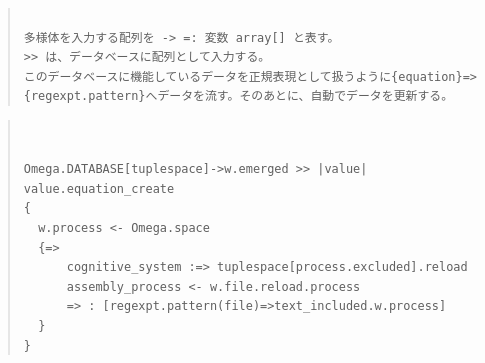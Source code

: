 \documentclass{jsarticle}
\begin{document}
\begin{quote}
\setlength{\baselineskip}{12pt}
\begin{verbatim}
 
多様体を入力する配列を -> =: 変数 array[] と表す。
>> は、データベースに配列として入力する。
このデータベースに機能しているデータを正規表現として扱うように{equation}=>
{regexpt.pattern}へデータを流す。そのあとに、自動でデータを更新する。
\end{verbatim}
\end{quote}

\begin{quote}
\setlength{\baselineskip}{12pt}
\begin{verbatim}


Omega.DATABASE[tuplespace]->w.emerged >> |value| value.equation_create
{
  w.process <- Omega.space
  {=>
      cognitive_system :=> tuplespace[process.excluded].reload
      assembly_process <- w.file.reload.process
      => : [regexpt.pattern(file)=>text_included.w.process]
  }
}
\end{verbatim}
\end{quote}
\end{document}
